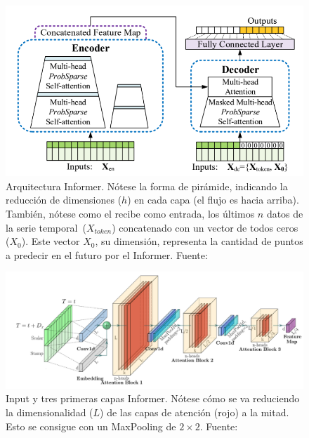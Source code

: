 \begin{figure}[H]
    \centering
    \includegraphics[scale = 0.75]{imgs/informer_distill.png}
    \caption{Arquitectura Informer. Nótese la forma de pirámide, indicando la reducción de dimensiones ($h$) en cada capa (el flujo es hacia arriba). También, nótese como el  recibe como entrada, los últimos $n$ datos de la serie temporal\protect\fnm\ ($X_{token}$) concatenado con un vector de todos ceros ($X_0$). Este vector $X_0$, su dimensión, representa la cantidad de puntos a predecir en el futuro por el Informer. \scriptsize{Fuente: \parencite{informer}}}
    \label{distill}
\end{figure}

\begin{figure}[H]
    \centering
    \includegraphics[scale = 0.5]{imgs/informer_maxPooling.png}
    \caption{Input y tres primeras capas  Informer. Nótese cómo se va reduciendo la dimensionalidad ($L$) de las capas de atención (rojo) a la mitad. Esto se consigue con un MaxPooling de $2\times2$. \scriptsize{Fuente: \parencite{informer}}}
    \label{maxPooling}
\end{figure}


